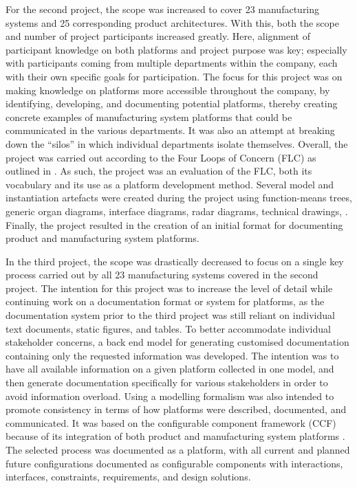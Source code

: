 For the second project, the scope was increased to cover 23 manufacturing systems and 25 corresponding product architectures.
With this, both the scope and number of project participants increased greatly. 
Here, alignment of participant knowledge on both platforms and project purpose was key; especially with participants coming from multiple departments within the company, each with their own specific goals for participation.
The focus for this project was on making knowledge on platforms more accessible throughout the company, by identifying, developing, and documenting potential platforms, thereby creating concrete examples of manufacturing system platforms that could be communicated in the various departments.
It was also an attempt at breaking down the ``silos'' in which individual departments isolate themselves.
Overall, the project was carried out according to the Four Loops of Concern (FLC) as outlined in \parencite{SorensenMCPC2017}.
As such, the project was an evaluation of the FLC, both its vocabulary and its use as a platform development method. 
Several model and instantiation artefacts were created during the project using \eg{} function-means trees, generic organ diagrams, interface diagrams, radar diagrams, technical drawings, \etc. 
Finally, the project resulted in the creation of an initial format for documenting product and manufacturing system platforms.

In the third project, the scope was drastically decreased to focus on a single key process carried out by all 23 manufacturing systems covered in the second project.
The intention for this project was to increase the level of detail while continuing work on a documentation format or system for platforms, as the documentation system prior to the third project was still reliant on individual text documents, static figures, and tables.
To better accommodate individual stakeholder concerns, a back end model for generating customised documentation containing only the requested information was developed.
The intention was to have all available information on a given platform collected in one model, and then generate documentation specifically for various stakeholders in order to avoid information overload.
Using a modelling formalism was also intended to promote consistency in terms of how platforms were described, documented, and communicated.
It was based on the configurable component framework (CCF) because of its integration of both product and manufacturing system platforms \parencite{Claesson2006,Michaelis2015203}.
The selected process was documented as a platform, with all current and planned future configurations documented as configurable components with interactions, interfaces, constraints, requirements, and design solutions.

